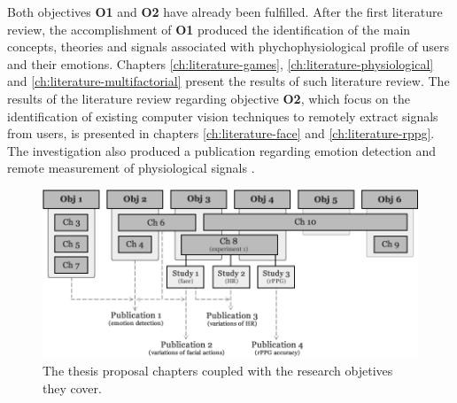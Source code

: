 
Both objectives \textbf{O1} and \textbf{O2} have already been fulfilled. After the first literature review, the accomplishment of \textbf{O1} produced the identification of the main concepts, theories and signals associated with phychophysiological profile of users and their emotions. Chapters \ref{ch:literature-games}, \ref{ch:literature-physiological} and \ref{ch:literature-multifactorial} present the results of such literature review. The results of the literature review regarding objective \textbf{O2}, which focus on the identification of existing computer vision techniques to remotely extract signals from users, is presented in chapters \ref{ch:literature-face} and \ref{ch:literature-rppg}. The investigation also produced a publication regarding emotion detection and remote measurement of physiological signals \parencite{bevilacqua2015proposal}.

\begin{figure}[ht]
    \centering
    \includegraphics[width=\textwidth]{figures/research-current-state.png}
    \caption{The thesis proposal chapters coupled with the research objetives they cover.}
    \label{fig:research-current-state}
\end{figure}

